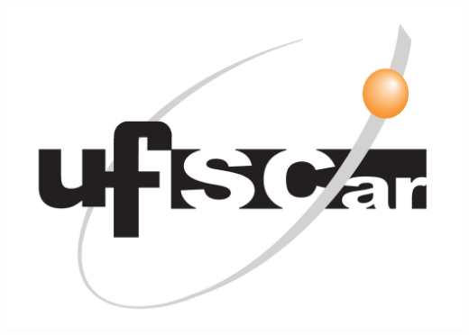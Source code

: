 \begin{folhadeaprovacao}
   \noindent\begin{minipage}{0.3\textwidth}
      \includegraphics[width=\linewidth]{lib/ufscar.pdf}
      \end{minipage}%
      \hfill%
      \begin{minipage}{0.7\textwidth}\center
      \imprimirinstituicao
   \end{minipage}


   

\end{folhadeaprovacao}
